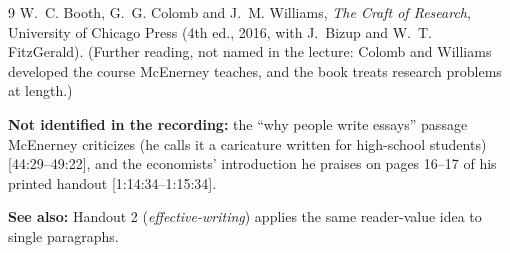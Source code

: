 \documentclass[11pt]{article}
\newcommand{\tsin}[1]{\mbox{\sffamily\footnotesize\color{muted}[#1]}} %
\begin{document}
{\begin{thebibliography}{9}
W.~C. Booth, G.~G. Colomb and J.~M. Williams, \emph{The Craft of Research}, University of Chicago Press (4th ed.,
2016, with J.~Bizup and W.~T. FitzGerald). (Further reading, not named in the lecture: Colomb and Williams
developed the course McEnerney teaches, and the book treats research problems at length.)

\end{thebibliography}

\textbf{Not identified in the recording:} the ``why people write essays'' passage McEnerney criticizes (he calls
it a caricature written for high-school students) \tsin{44:29--49:22}, and the economists' introduction he praises
on pages 16--17 of his printed handout \tsin{1:14:34--1:15:34}.

\textbf{See also:} Handout 2 (\emph{effective-writing}) applies the same reader-value idea to single paragraphs.
}
\end{document}
